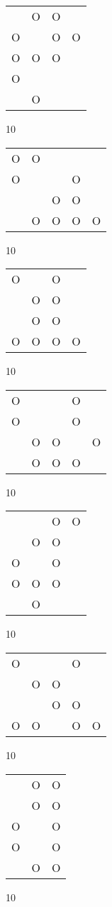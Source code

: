 \begin{tabular}{|m{0.2cm}m{0.2cm}m{0.2cm}m{0.2cm}|}\hline
 &O&O& \\
O& &O&O\\
O&O&O& \\
O& & & \\
 &O& & \\
\hline\end{tabular}10
\begin{tabular}{|m{0.2cm}m{0.2cm}m{0.2cm}m{0.2cm}m{0.2cm}|}\hline
O&O& & & \\
O& & &O& \\
 & &O&O& \\
 &O&O&O&O\\
\hline\end{tabular}10
\begin{tabular}{|m{0.2cm}m{0.2cm}m{0.2cm}m{0.2cm}|}\hline
O& &O& \\
 &O&O& \\
 &O&O& \\
O&O&O&O\\
\hline\end{tabular}10
\begin{tabular}{|m{0.2cm}m{0.2cm}m{0.2cm}m{0.2cm}m{0.2cm}|}\hline
O& & &O& \\
O& & &O& \\
 &O&O& &O\\
 &O&O&O& \\
\hline\end{tabular}10
\begin{tabular}{|m{0.2cm}m{0.2cm}m{0.2cm}m{0.2cm}|}\hline
 & &O&O\\
 &O&O& \\
O& &O& \\
O&O&O& \\
 &O& & \\
\hline\end{tabular}10
\begin{tabular}{|m{0.2cm}m{0.2cm}m{0.2cm}m{0.2cm}m{0.2cm}|}\hline
O& & &O& \\
 &O&O& & \\
 & &O&O& \\
O&O& &O&O\\
\hline\end{tabular}10
\begin{tabular}{|m{0.2cm}m{0.2cm}m{0.2cm}|}\hline
 &O&O\\
 &O&O\\
O& &O\\
O& &O\\
 &O&O\\
\hline\end{tabular}10
